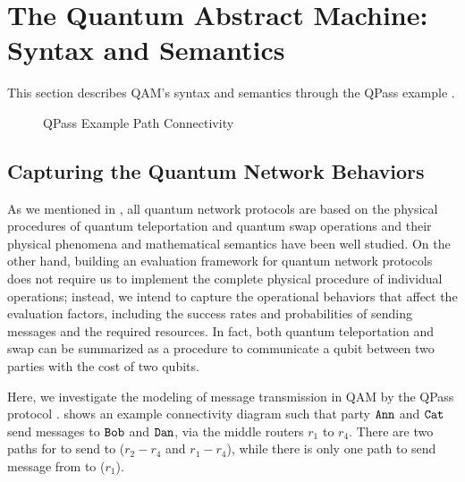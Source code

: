 \section{The Quantum Abstract Machine:  Syntax and Semantics} \label{sec:qam}

This section describes QAM's syntax and semantics through the QPass example \cite{10.1145/3387514.3405853}.

\begin{figure}[t]
{\small
\begin{center}
\end{center}
}
\caption{QPass Example Path Connectivity}
  \label{fig:q-pi-example}
\end{figure}

\subsection{Capturing the Quantum Network Behaviors} \label{sec:qamexample}

As we mentioned in , all quantum network protocols are based on the physical procedures of quantum teleportation and quantum swap operations and their physical phenomena and mathematical semantics have been well studied.
On the other hand, building an evaluation framework for quantum network protocols does not require us to implement the complete physical procedure of individual operations; 
instead, we intend to capture the operational behaviors that affect the evaluation factors,
including the success rates and probabilities of sending messages and the required resources.
In fact, both quantum teleportation and swap can be summarized as a procedure to communicate a qubit between two parties with the cost of two qubits.

Here, we investigate the modeling of message transmission in QAM by the QPass protocol \cite{10.1145/3387514.3405853}.
 shows an example connectivity diagram such that party $\texttt{Ann}$ and $\texttt{Cat}$ send messages to $\texttt{Bob}$ and $\texttt{Dan}$, via the middle routers $r_1$ to $r_4$. There are two paths for  to send to  ($r_2 - r_4$ and $r_1 - r_4$), while there is only one path to send message from  to  ($r_1$). 


